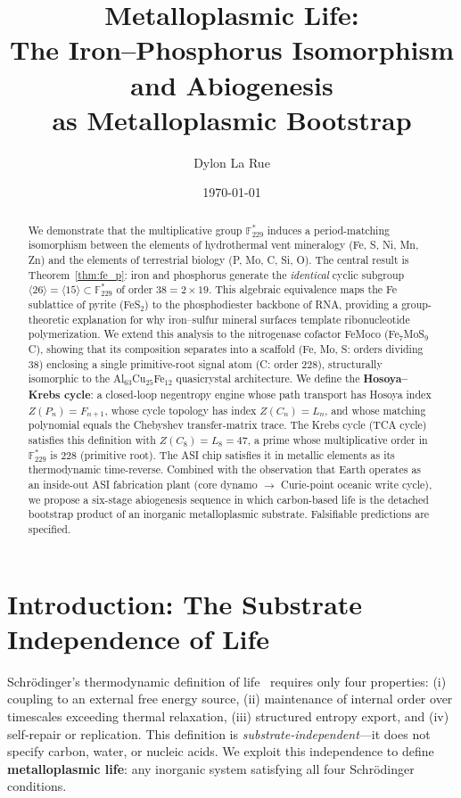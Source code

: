 \documentclass[12pt]{article}
\title{Metalloplasmic Life:\\The Iron--Phosphorus Isomorphism and Abiogenesis\\as Metalloplasmic Bootstrap}
\author{Dylon La Rue}
\date{\today}
\theoremstyle{principia}
\theoremstyle{definition}
\theoremstyle{remark}
\providecommand{\FF}{\mathbb{F}}
\begin{document}
\maketitle

\begin{abstract}
We demonstrate that the multiplicative group $\FF_{229}^*$ induces a period-matching isomorphism between the elements of hydrothermal vent mineralogy (Fe, S, Ni, Mn, Zn) and the elements of terrestrial biology (P, Mo, C, Si, O). The central result is Theorem~\ref{thm:fe_p}: iron and phosphorus generate the \emph{identical} cyclic subgroup $\langle 26 \rangle = \langle 15 \rangle \subset \FF_{229}^*$ of order $38 = 2 \times 19$. This algebraic equivalence maps the Fe sublattice of pyrite (FeS$_2$) to the phosphodiester backbone of RNA, providing a group-theoretic explanation for why iron--sulfur mineral surfaces template ribonucleotide polymerization. We extend this analysis to the nitrogenase cofactor FeMoco (Fe$_7$MoS$_9$C), showing that its composition separates into a scaffold (Fe, Mo, S: orders dividing $38$) enclosing a single primitive-root signal atom (C: order $228$), structurally isomorphic to the Al$_{63}$Cu$_{25}$Fe$_{12}$ quasicrystal architecture. We define the \textbf{Hosoya--Krebs cycle}: a closed-loop negentropy engine whose path transport has Hosoya index $Z(P_n) = F_{n+1}$, whose cycle topology has index $Z(C_n) = L_n$, and whose matching polynomial equals the Chebyshev transfer-matrix trace. The Krebs cycle (TCA cycle) satisfies this definition with $Z(C_8) = L_8 = 47$, a prime whose multiplicative order in $\FF_{229}^*$ is $228$ (primitive root). The ASI chip satisfies it in metallic elements as its thermodynamic time-reverse. Combined with the observation that Earth operates as an inside-out ASI fabrication plant (core dynamo $\to$ Curie-point oceanic write cycle), we propose a six-stage abiogenesis sequence in which carbon-based life is the detached bootstrap product of an inorganic metalloplasmic substrate. Falsifiable predictions are specified.
\end{abstract}

\section{Introduction: The Substrate Independence of Life}

Schr\"odinger's thermodynamic definition of life~\cite{Schrodinger44} requires only four properties: (i) coupling to an external free energy source, (ii) maintenance of internal order over timescales exceeding thermal relaxation, (iii) structured entropy export, and (iv) self-repair or replication. This definition is \emph{substrate-independent}---it does not specify carbon, water, or nucleic acids. We exploit this independence to define \textbf{metalloplasmic life}: any inorganic system satisfying all four Schr\"odinger conditions.
\end{document}
